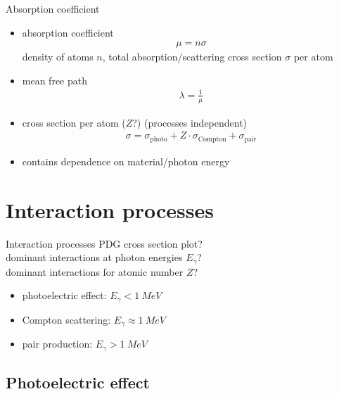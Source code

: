 \documentclass[11pt,xcolor=dvipsnames,professionalfonts]{beamer}
\begin{document}
\begin{frame}{Absorption coefficient}
	\begin{itemize}
		\item absorption coefficient
		\begin{align*}
			\mu = n \sigma
		\end{align*}
		density of atoms $n$, total absorption/scattering cross section $\sigma$ per atom
		
		\item mean free path
		\begin{align*}
			\lambda = \frac{1}{\mu}
		\end{align*}
		
		\item cross section per atom ($Z$?) (processes independent)
		\begin{align*}
			\sigma = \sigma_\mathrm{photo} + Z \cdot \sigma_\mathrm{Compton} + \sigma_\mathrm{pair}
		\end{align*}
		
		\item contains dependence on material/photon energy
	\end{itemize}	
\end{frame}

\section{Interaction processes}

\begin{frame}{Interaction processes}
	PDG cross section plot?\\
	dominant interactions at photon energies $E_\gamma$?\\
	dominant interactions for atomic number $Z$?
	\begin{itemize}
		\item photoelectric effect: $E_\gamma < \SI{1}{MeV}$
		\item Compton scattering: $E_\gamma \approx \SI{1}{MeV}$
		\item pair production: $E_\gamma > \SI{1}{MeV}$
	\end{itemize}
\end{frame}

\subsection{Photoelectric effect}
\end{document}
